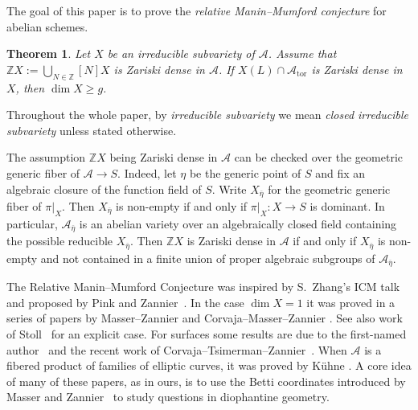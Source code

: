 \documentclass[12pt,oneside]{amsart}
\newcounter{maincounter}
\numberwithin{maincounter}{section}
\numberwithin{equation}{section}
\newtheorem{theorem}[maincounter]{Theorem}
\def\ZZ{\mathbb{Z}}
\newcommand{\cal}{\mathcal}
\newcommand{\cA}{\cal{A}}
\begin{document}
The goal of this paper is to prove the \textit{relative Manin--Mumford
  conjecture} for abelian schemes.

\begin{theorem}
  \label{MainThm}
  Let $X$ be an irreducible subvariety of $\cA$. Assume that
  $\mathbb{Z}X := \bigcup_{N\in \mathbb{Z}} [N]X$ is Zariski dense in
  $\cA$.
  If $X(L) \cap \cA_{\mathrm{tor}}$ is Zariski dense in $X$, then
  $\dim X \ge g$.
\end{theorem}
Throughout the whole paper, by \textit{irreducible subvariety} we mean \textit{closed irreducible subvariety} unless stated otherwise.


The assumption $\ZZ X$ being Zariski dense in $\cA$ can be checked
over the geometric generic fiber of $\cA \rightarrow S$. Indeed, let
$\eta$ be the generic point of $S$ and fix an algebraic closure of the
function field of $S$. Write $X_{\overline{\eta}}$ for the geometric
generic fiber of $\pi|_X$.
Then $X_{\overline \eta}$ is non-empty if and only if $\pi|_X\colon
X\rightarrow S$ is dominant.
In particular, $\cA_{\overline{\eta}}$ is an abelian variety over
an algebraically closed field containing the possible reducible $X_{\overline\eta}$. Then $\ZZ X$ is Zariski dense in $\cA$
if and only if $X_{\overline{\eta}}$ is non-empty and not contained in
a finite union of proper algebraic subgroups of $\cA_{\overline{\eta}}$.


The Relative Manin--Mumford Conjecture was inspired by S.~Zhang's ICM
talk \cite{zhang1998small} and proposed by Pink \cite[Conjecture~6.2]{Pink} and %
Zannier~\cite{ZannierBook}. In the case $\dim X=1$ it was proved in a
series of papers by Masser--Zannier and Corvaja--Masser--Zannier
\cite{MZ:torsionanomalous,MasserZannierTorsionPointOnSqEC,
MASSER2014116, MasserZannierRelMMSimpleSur, CorvajaMasserZannier2018,
MasserZannierRMMoverCurve}. See also work of
Stoll~\cite{Stoll:simtorsion} for an explicit case. For surfaces some 
results are due to the first-named author~\cite{hab:weierstrass} and the recent work of 
Corvaja--Tsimerman--Zannier~\cite{CTZ:23}. When $\cA$ is a fibered product of families of elliptic curves, it was proved by K\"{u}hne \cite{KuehneRBC}. A core idea of many of these papers, as in ours, is to 
use the Betti coordinates introduced by Masser and Zannier~\cite{MZ:torsionanomalous} to study questions in diophantine
geometry.
\end{document}
